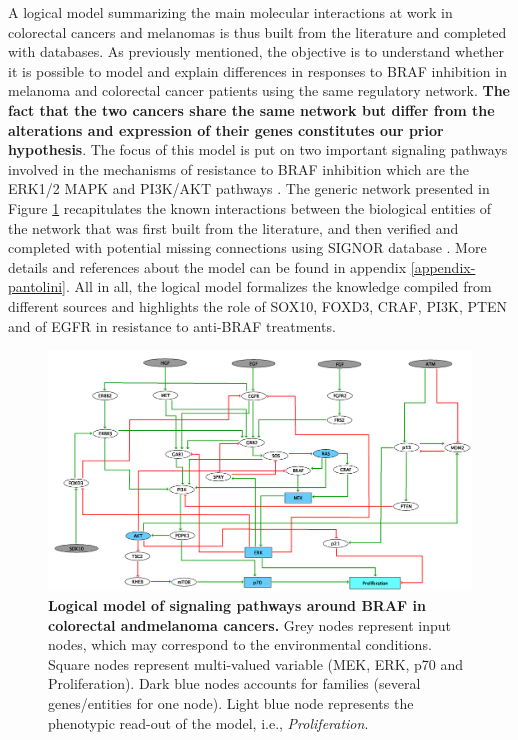 \documentclass[a4paper,12pt,twoside,onecolumn,openright,final,oldfontcommands]{memoir}
\begin{document}
A logical model summarizing the main molecular interactions at work in
colorectal cancers and melanomas is thus built from the literature and
completed with databases. As previously mentioned, the objective is to
understand whether it is possible to model and explain differences in
responses to BRAF inhibition in melanoma and colorectal cancer patients
using the same regulatory network. \textbf{The fact that the two cancers
share the same network but differ from the alterations and expression of
their genes constitutes our prior hypothesis}. The focus of this model
is put on two important signaling pathways involved in the mechanisms of
resistance to BRAF inhibition which are the ERK1/2 MAPK and PI3K/AKT
pathways \citep{ursem2018emerging, rossi2019drug}. The generic network
presented in Figure \ref{fig:BRAF-model} recapitulates the known
interactions between the biological entities of the network that was
first built from the literature, and then verified and completed with
potential missing connections using SIGNOR database
\citep{perfetto2016signor}. More details and references about the model
can be found in appendix \ref{appendix-pantolini}. All in all, the
logical model formalizes the knowledge compiled from different sources
and highlights the role of SOX10, FOXD3, CRAF, PI3K, PTEN and of EGFR in
resistance to anti-BRAF treatments.

\begin{figure}

{\centering \includegraphics[width=0.9\linewidth]{fig/BRAF-model} 

}

\caption[Logical model of signaling pathways around BRAF in colorectal andmelanoma cancers]{\textbf{Logical model of signaling pathways
around BRAF in colorectal andmelanoma cancers.} Grey nodes represent
input nodes, which may correspond to the environmental conditions.
Square nodes represent multi-valued variable (MEK, ERK, p70 and
Proliferation). Dark blue nodes accounts for families (several
genes/entities for one node). Light blue node represents the phenotypic
read-out of the model, i.e., \emph{Proliferation}.}\label{fig:BRAF-model}
\end{figure}
\end{document}
